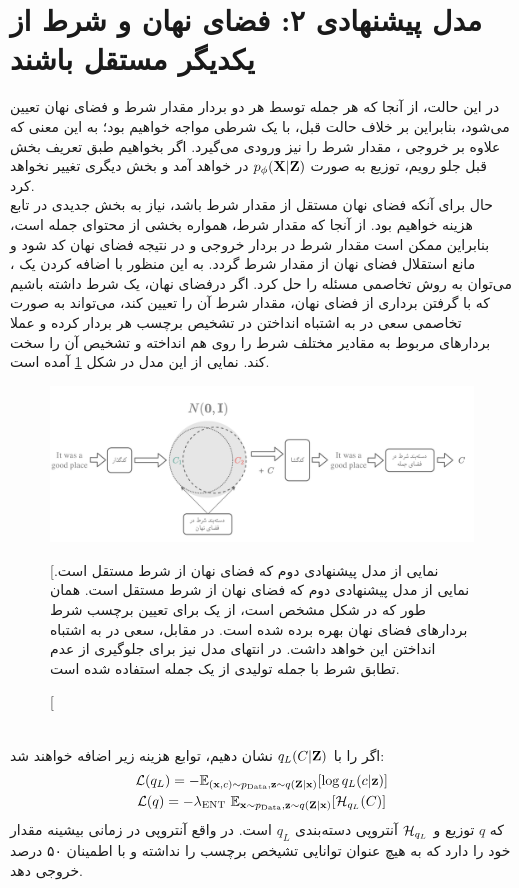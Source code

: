 \section{مدل پیشنهادی ۲: فضای نهان و شرط از یکدیگر مستقل باشند}
در این حالت، از آنجا که هر جمله توسط هر دو بردار مقدار شرط و فضای نهان تعیین می‌شود، بنابراین بر خلاف حالت قبل، با یک \decoder{} شرطی مواجه خواهیم بود؛ به این معنی که علاوه بر خروجی \encoder{}، مقدار شرط را نیز ورودی می‌گیرد. اگر بخواهیم طبق تعریف بخش قبل جلو رویم، توزیع \decoder{} به صورت  $p_\phi({\bf X}|{\bf Z})$ در خواهد آمد و بخش دیگری تغییر نخواهد کرد.
\\
حال برای آنکه فضای نهان مستقل از مقدار شرط باشد، نیاز به بخش جدیدی در تابع هزینه خواهیم بود. از آنجا که مقدار شرط، همواره بخشی از محتوای جمله است، بنابراین ممکن است مقدار شرط در بردار خروجی \encoder{} و در نتیجه فضای نهان کد شود و مانع استقلال فضای نهان از مقدار شرط گردد. به این منظور با اضافه کردن یک \classifier{}، می‌توان به روش تخاصمی مسئله را حل کرد. اگر درفضای نهان، یک \classifier{} شرط داشته باشیم که با گرفتن برداری از فضای نهان، مقدار شرط آن را تعیین کند، \encoder{} می‌تواند به صورت تخاصمی سعی در به اشتباه انداختن \classifier{} در تشخیص برچسب هر بردار کرده و عملا بردار‌های مربوط به مقادیر مختلف شرط را روی هم انداخته و تشخیص آن را سخت کند. نمایی از این مدل در شکل \ref{fig:chap4:prop2} آمده است.
\begin{figure}[h]
    \centering
        \includegraphics[width=1.\textwidth]{images/propdis.pdf}
        \caption
        [نمایی از مدل پیشنهادی دوم که فضای نهان از شرط مستقل است.]
        {
            نمایی از مدل پیشنهادی دوم که فضای نهان از شرط مستقل است. همان طور که در شکل مشخص است، از یک \classifier{} برای تعیین برچسب شرط بردارهای فضای نهان بهره برده شده است. در مقابل، \encoder{} سعی در به اشتباه انداختن این \classifier{} خواهد داشت. در انتهای مدل نیز برای جلوگیری از عدم تطابق شرط با جمله تولیدی از یک \classifier{} جمله استفاده شده است.
        }
    \label{fig:chap4:prop2}
\end{figure}
\\
اگر \classifier{} را با $q_L(C|{\bf Z})$ نشان دهیم، توابع هزینه زیر اضافه خواهند شد:
\begin{gather}
    {\mathcal{L}}(q_L) = -\mathbb E_{({\bf x},c) \sim p_\text{Data}, {\bf z} \sim q({\bf Z}|{\bf x})} [\log q_L(c|{\bf z})]
    \\
    {\mathcal{L}}(q) = -\lambda_\text{ENT} ~\mathbb E_{{\bf x} \sim p_\text{Data}, {\bf z} \sim q({\bf Z}|{\bf x})} [{\mathcal{H}}_{q_L}(C)]
\end{gather}
که $q$ توزیع \encoder{} و  ${\mathcal{H}}_{q_L}$ آنتروپی دسته‌بندی \classifier{} 
$q_L$ 
است. در واقع آنتروپی در زمانی بیشینه مقدار خود را دارد که \classifier{} به هیچ عنوان توانایی تشیخص برچسب را نداشته و با اطمینان ۵۰ درصد خروجی دهد.

